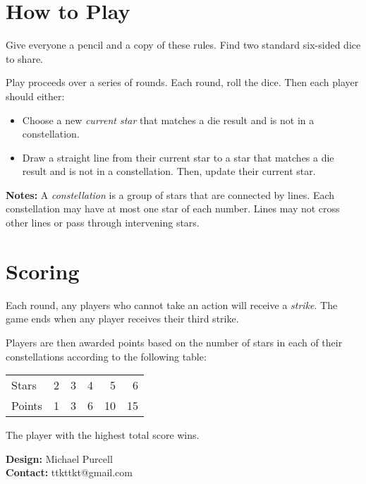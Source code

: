 \documentclass[a4paper, parskip=half]{scrartcl}
\begin{document}
\setmainfont{Ubuntu}%
\raggedright
\begin{multicols}{2}
\section*{How to Play}
Give everyone a pencil and a copy of these rules. Find two standard six-sided dice to share.

Play proceeds over a series of rounds. Each round, roll the dice. Then each player should either:
\begin{itemize}[leftmargin=*]
	\item Choose a new \emph{current star} that matches a die result and is not in a constellation.	
	\item Draw a straight line from their current star to a star that matches a die result and is not in a constellation. Then, update their current star.
\end{itemize}

\textbf{Notes:} A \emph{constellation} is a group of stars that are connected by lines. Each constellation may have at most one star of each number. Lines may not cross other lines or pass through intervening stars.\vfill\null\columnbreak


\section*{Scoring}
Each round, any players who cannot take an action will receive a \emph{strike}. The game ends when any player receives their third strike.

Players are then awarded points based on the number of stars in each of their constellations according to the following table:

\begin{center}
\begin{tabular}{l rrrrr} \toprule
Stars & 2 & 3 & 4 & 5 & 6 \\
Points & \phantom{1}1 & \phantom{1}3 &\phantom{1}6 & 10 & 15 \\ \bottomrule
\end{tabular}
\end{center}

\vspace{1ex}

The player with the highest total score wins.

\vspace{1ex}

\textbf{Design:} Michael Purcell\\
\textbf{Contact:} ttkttkt@gmail.com \vfill\null
\end{multicols}
\end{document}
